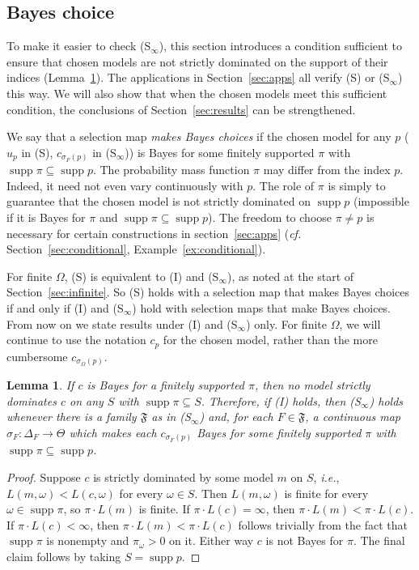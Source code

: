 \documentclass[11pt]{article}
\newtheorem{lemma}[theorem]{Lemma}
\theoremstyle{definition}
\theoremstyle{remark}
\newcommand{\F}{\mathfrak F}
\newcommand{\supp}{\operatorname{supp}}
\begin{document}
\subsection{Bayes choice}

To make it easier to check (S$_\infty$), this section introduces a condition sufficient to ensure that chosen models are not strictly dominated on the support of their indices (Lemma~\ref{lem:bayes-choice}). The applications in Section~\ref{sec:apps} all verify (S) or (S$_\infty$) this way. We will also show that when the chosen models meet this sufficient condition, the conclusions of Section~\ref{sec:results} can be strengthened.



We say that a selection map \emph{makes Bayes choices} if the chosen model for any $p$ ($u_p$ in (S), $c_{\sigma_F(p)}$ in (S$_\infty$)) is Bayes for some finitely supported $\pi$ with $\supp\pi\subseteq\supp p$. The probability mass function $\pi$ may differ from the index $p$. Indeed, it need not even vary continuously with $p$. The role of $\pi$ is simply to guarantee that the chosen model is not strictly dominated on $\supp p$ (impossible if it is Bayes for $\pi$ and $\supp\pi\subseteq\supp p$). The freedom to choose $\pi\ne p$ is necessary for certain constructions in section~\ref{sec:apps} (\textit{cf.} Section~\ref{sec:conditional}, Example~\ref{ex:conditional}).

For finite $\Omega$, (S) is equivalent to (I) and (S$_\infty$), as noted at the start of Section~\ref{sec:infinite}. So (S) holds with a selection map that makes Bayes choices if and only if (I) and (S$_\infty$) hold with selection maps that make Bayes choices. From now on we state results under (I) and (S$_\infty$) only. For finite $\Omega$, we will continue to use the notation $c_p$ for the chosen model, rather than the more cumbersome $c_{\sigma_\Omega(p)}$. 


\begin{lemma}\label{lem:bayes-choice}
If $c$ is Bayes for a finitely supported $\pi$, then no model strictly dominates $c$ on any $S$ with $\supp\pi\subseteq S$. Therefore, if (I) holds, then (S$_\infty$) holds whenever there is a family $\F$ as in (S$_\infty$) and, for each $F\in\F$, a continuous map $\sigma_F:\Delta_F\to\Theta$ which makes each $c_{\sigma_F(p)}$ Bayes for some finitely supported $\pi$ with $\supp\pi\subseteq\supp p$.
\end{lemma}
\begin{proof}
Suppose $c$ is strictly dominated by some model $m$ on $S$, \textit{i.e.}, $L(m,\omega)<L(c,\omega)$ for every $\omega\in S$. Then $L(m,\omega)$ is finite for every $\omega\in\supp\pi$, so $\pi\cdot L(m)$ is finite. If $\pi\cdot L(c)=\infty$, then $\pi\cdot L(m)<\pi\cdot L(c)$. If $\pi\cdot L(c)<\infty$, then $\pi\cdot L(m)<\pi\cdot L(c)$ follows trivially from the fact that $\supp\pi$ is nonempty and $\pi_\omega>0$ on it. Either way $c$ is not Bayes for $\pi$. The final claim follows by taking $S=\supp p$.
\end{proof}
\end{document}
